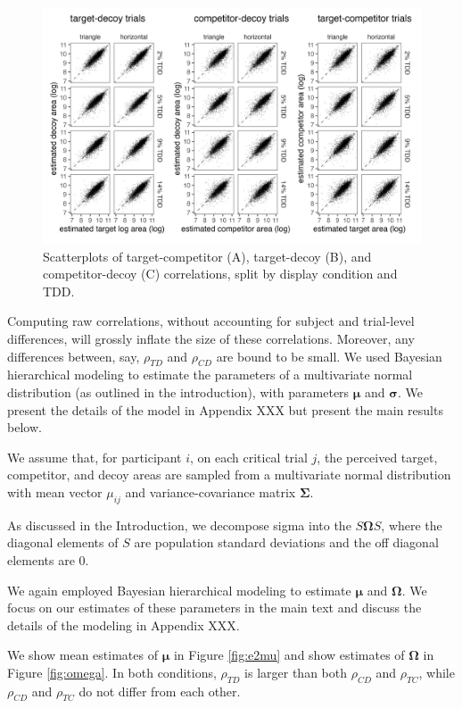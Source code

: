 \documentclass{umassthesis}          %
\begin{document}
\begin{figure}
   \includegraphics[width=\textwidth]{figures/circleAreaPhase_cor_plot_all_no_outliers.jpg}
   \caption{Scatterplots of target-competitor (A), target-decoy (B), and competitor-decoy (C) correlations, split by display condition and TDD.}
   \label{fig:raw_cors}
\end{figure}

Computing raw correlations, without accounting for subject and trial-level differences, will grossly inflate the size of these correlations. Moreover, any differences between, say, $\rho_{TD}$ and $\rho_{CD}$ are bound to be small. We used Bayesian hierarchical modeling to estimate the parameters of a multivariate normal distribution (as outlined in the introduction), with parameters $\mathbf{\mu}$ and $\mathbf{\sigma}$. We present the details of the model in Appendix XXX but present the main results below.

We assume that, for participant $i$, on each critical trial $j$, the perceived target, competitor, and decoy areas are sampled from a multivariate normal distribution with mean vector $\mu_{ij}$ and variance-covariance matrix $\mathbf{\Sigma}$. 

As discussed in the Introduction, we decompose sigma into the $S\mathbf{\Omega}S$, where the diagonal elements of $S$ are population standard deviations and the off diagonal elements are 0. 

We again employed Bayesian hierarchical modeling to estimate $\mathbf{\mu}$ and $\mathbf{\Omega}$. We focus on our estimates of these parameters in the main text and discuss the details of the modeling in Appendix XXX. 

We show mean estimates of $\mathbf{\mu}$ in Figure \ref{fig:e2mu} and show estimates of $\mathbf{\Omega}$ in Figure \ref{fig:omega}. In both conditions, $\rho_{TD}$ is larger than both $\rho_{CD}$ and $\rho_{TC}$, while $\rho_{CD}$ and $\rho_{TC}$ do not differ from each other. 
\end{document}
